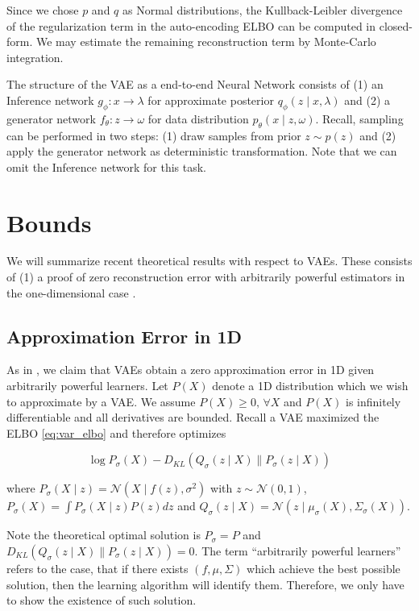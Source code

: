 \documentclass[11pt]{article}
\theoremstyle{plain}
\theoremstyle{definition}
\theoremstyle{plain}
\begin{document}
Since we chose $p$ and $q$ as Normal distributions, the Kullback-Leibler
divergence of the regularization term in the auto-encoding ELBO can
be computed in closed-form. We may estimate the remaining reconstruction
term by Monte-Carlo integration.

The structure of the VAE as a end-to-end Neural Network consists of
(1) an Inference network $g_{\phi}:x\rightarrow\lambda$ for approximate
posterior $q_{\phi}(z\mid x,\lambda)$ and (2) a generator network
$f_{\theta}:z\rightarrow\omega$ for data distribution $p_{\theta}(x\mid z,\omega)$.
Recall, sampling can be performed in two steps: (1) draw samples from
prior $z\sim p(z)$ and (2) apply the generator network as deterministic
transformation. Note that we can omit the Inference network for this
task.

\section{Bounds}

We will summarize recent theoretical results with respect to VAEs.
These consists of (1) a proof of zero reconstruction error with arbitrarily
powerful estimators in the one-dimensional case \cite{doersch2016tutorial}.

\subsection{Approximation Error in 1D}

As in \cite{doersch2016tutorial}, we claim that VAEs obtain a zero
approximation error in 1D given arbitrarily powerful learners. Let
$P(X)$ denote a 1D distribution which we wish to approximate by a
VAE. We assume $P(X)\geq0,\,\forall X$ and $P(X)$ is infinitely
differentiable and all derivatives are bounded. Recall a VAE maximized
the ELBO \eqref{eq:var_elbo} and therefore optimizes

\begin{equation}
\log P_{\sigma}(X)-D_{KL}\left(Q_{\sigma}(z\mid X)\rVert P_{\sigma}(z\mid X)\right)
\end{equation}

where $P_{\sigma}(X\mid z)=\mathcal{N}(X\mid f(z),\sigma^{2})$ with
$z\sim\mathcal{N}(0,1)$, $P_{\sigma}(X)=\int P_{\sigma}(X\mid z)P(z)dz$
and $Q_{\sigma}(z\mid X)=\mathcal{N}(z\mid\mu_{\sigma}(X),\Sigma_{\sigma}(X))$. 

Note the theoretical optimal solution is $P_{\sigma}=P$ and $D_{KL}\left(Q_{\sigma}(z\mid X)\rVert P_{\sigma}(z\mid X)\right)=0$.
The term ``arbitrarily powerful learners'' refers to the case, that
if there exists $(f,\mu,\Sigma)$ which achieve the best possible
solution, then the learning algorithm will identify them. Therefore,
we only have to show the existence of such solution.
\end{document}
